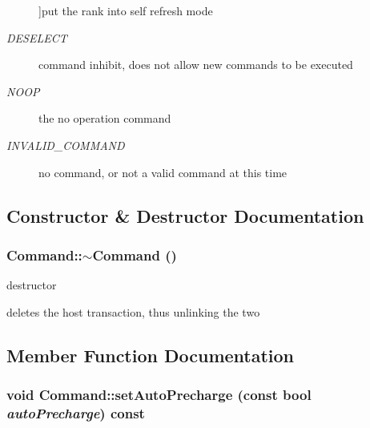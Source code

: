 \begin{CompactItemize}
\begin{Desc}
\begin{description}
{}]put the rank into self refresh mode \item[{\em 
DESELECT\label{class_d_r_a_msim_i_i_1_1_command_6da0b8d60d4902551918e57f30350e9299fb83bee151099cd3cea20f39703a56}
}]command inhibit, does not allow new commands to be executed \item[{\em 
NOOP\label{class_d_r_a_msim_i_i_1_1_command_6da0b8d60d4902551918e57f30350e9268f7f9c34c9e0886a0069a19b140944e}
}]the no operation command \item[{\em 
INVALID\_\-COMMAND\label{class_d_r_a_msim_i_i_1_1_command_6da0b8d60d4902551918e57f30350e9265654c338c8418fc0ef506dbd0503c05}
}]no command, or not a valid command at this time \end{description}
\end{Desc}



\subsection{Constructor \& Destructor Documentation}
\subsubsection[{$\sim$Command}]{\setlength{\rightskip}{0pt plus 5cm}Command::$\sim$Command ()}\label{class_d_r_a_msim_i_i_1_1_command_b552bb3a07fdd1acbfd8ea76e69b2278}


destructor 

deletes the host transaction, thus unlinking the two 

\subsection{Member Function Documentation}
\subsubsection[{setAutoPrecharge}]{\setlength{\rightskip}{0pt plus 5cm}void Command::setAutoPrecharge (const bool {\em autoPrecharge}) const}\label{class_d_r_a_msim_i_i_1_1_command_e1df06fd9d7d4a40113ba76d37196575}



\end{CompactItemize}
